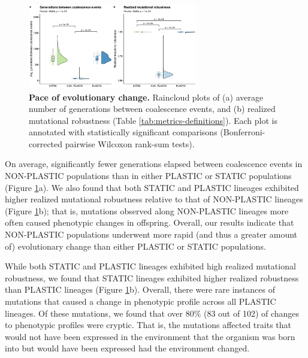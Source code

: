\documentclass[utf8]{frontiersSCNS} %
\begin{document}
\begin{raggedbottom}
\begin{figure}[h!]
  \centering
  \includegraphics[width=0.66\textwidth]{media-evolutionary-change-pace-panel.pdf}
  \caption{\small
  \textbf{Pace of evolutionary change.}
  Raincloud plots of
  (a) average number of generations between coalescence events,
  and (b) realized mutational robustness (Table \ref{tab:metrics-definitions}).
  Each plot is annotated with statistically significant comparisons (Bonferroni-corrected pairwise Wilcoxon rank-sum tests).
  }
  \label{fig:evolutionary-dynamics-rate}
\end{figure}

On average, significantly fewer generations elapsed between coalescence events in NON-PLASTIC populations than in either PLASTIC or STATIC populations (Figure \ref{fig:evolutionary-dynamics-rate}a).
We also found that both STATIC and PLASTIC lineages exhibited higher realized mutational robustness relative to that of NON-PLASTIC lineages (Figure \ref{fig:evolutionary-dynamics-rate}b); that is, mutations observed along NON-PLASTIC lineages more often caused phenotypic changes in offspring.
Overall, our results indicate that NON-PLASTIC populations underwent more rapid (and thus a greater amount of) evolutionary change than either PLASTIC or STATIC populations.

While both STATIC and PLASTIC lineages exhibited high realized mutational robustness, we found that STATIC lineages exhibited higher realized robustness than PLASTIC lineages (Figure \ref{fig:evolutionary-dynamics-rate}b).
Overall, there were rare instances of mutations that caused a change in phenotypic profile across all PLASTIC lineages.
Of these mutations, we found that over 80\% (83 out of 102) of changes to phenotypic profiles were cryptic.
That is, the mutations affected traits that would not have been expressed in the environment that the organism was born into but would have been expressed had the environment changed.


\end{raggedbottom}
\end{document}
